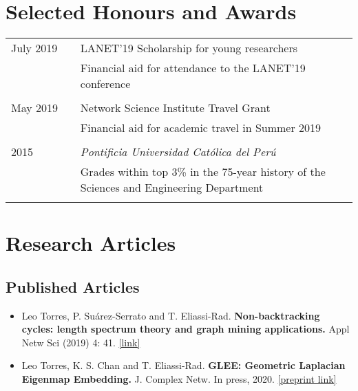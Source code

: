 \documentclass[12pt,]{scrartcl}
\begin{document}
\section{Selected Honours and
Awards}\label{selected-honours-and-awards}

\begin{table}[!h]
{\def\arraystretch{1}\tabcolsep=0pt
\begin{tabular}{p{0.2\linewidth}p{0.8\linewidth}}

July 2019 & LANET'19 Scholarship for young researchers \\
& Financial aid for attendance to the LANET'19 conference \\ \\

May 2019 & Network Science Institute Travel Grant \\
& Financial aid for academic travel in Summer 2019 \\ \\

2015 & \textit{Pontificia Universidad Católica del Perú} \\
& Grades within top 3\% in the 75-year history of the Sciences and Engineering Department \\ \\

\end{tabular}}
\end{table}


\newpage
\section{Research Articles}\label{publications}

\subsection{Published Articles}\label{articles}

\begin{itemize}
\leftskip-0.25in %

\item Leo Torres, P. Su\'arez-Serrato and T. Eliassi-Rad.  \textbf{Non-backtracking cycles: length spectrum theory and graph mining applications.}  Appl Netw Sci (2019) 4: 41. \href{https://doi.org/10.1007/s41109-019-0147-y}{[link]}

\item Leo Torres, K. S. Chan and T. Eliassi-Rad. \textbf{GLEE: Geometric Laplacian Eigenmap Embedding.} J. Complex Netw. In press, 2020. \href{https://arxiv.org/abs/1905.09763}{[preprint link]}

\end{itemize}
\end{document}
